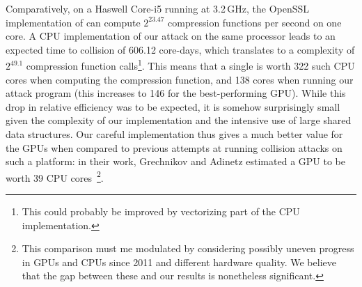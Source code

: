 Comparatively, on a Haswell Core-i5 running at 3.2\,GHz, the OpenSSL implementation of \shaone
can compute $2^{23.47}$ compression functions per second on one core. A CPU implementation of our attack
on the same processor leads to an expected time to collision of 606.12 core-days, which translates to a complexity of $2^{49.1}$
compression function calls\footnote{This could probably be improved by vectorizing part of the CPU implementation.}.
This means that a single \gtx is worth 322 such CPU cores when computing the \shaone compression function, and 138 cores when
running our attack program (this increases to 146 for the best-performing GPU).
While this drop in relative efficiency was to be expected, it is somehow surprisingly small given the
complexity of our implementation and \eg the intensive use of large shared data structures. Our careful implementation thus
gives a much better value for the GPUs when compared to previous attempts at running collision attacks on such a platform:
in their work, Grechnikov and Adinetz estimated a GPU to be worth 39 CPU cores~\cite{cryptoeprint:2011:641}\footnote{This comparison must me modulated by considering possibly uneven progress in GPUs and CPUs
since 2011 and different hardware quality. We believe that the gap between these and our results is nonetheless significant.}.
